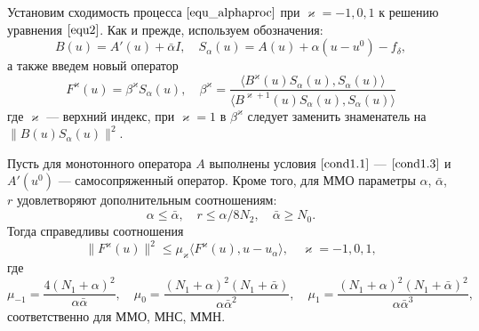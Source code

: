 Установим сходимость процесса $\eqref{equ_alphaproc}$ при $\varkappa=-1,0,1$ к решению уравнения $\eqref{equ2}$. Как и прежде, используем обозначения: 
$$B(u)=A'(u)+\bar\alpha I, \quad S_\alpha (u)=A(u)+\alpha(u-u^0)-f_\delta,
$$
а также введем новый оператор
$$F^\varkappa(u)=\beta^\varkappa S_\alpha(u), \quad \beta ^\varkappa =\frac{\langle B^\varkappa(u)S_\alpha(u), S_\alpha (u)\rangle}{\langle B^{\varkappa +1}(u)S_\alpha(u), S_\alpha(u)\rangle}$$ 
где $\varkappa$ --- верхний индекс, при $\varkappa=1$ в $\beta^\varkappa$ следует заменить знаменатель на $\|B(u)S_\alpha(u)\|^2$.%
\begin{theorem}\label{teo3.1}
	Пусть для монотонного оператора $A$ выполнены условия $\eqref{cond1.1}$ --- $\eqref{cond1.3}$ и $A'(u^0)$ --- самосопряженный оператор. Кроме того, для ММО параметры $\alpha$, $\bar\alpha$, $r$ удовлетворяют дополнительным соотношениям:
	\begin{equation}\label{cond3.3}
	\alpha \le \bar\alpha, \quad r\le \alpha/8N_2, \quad \bar\alpha \ge N_0.
	\end{equation}
	Тогда справедливы соотношения
	\begin{equation}\label{ineq3.4}
	\|F^\varkappa(u)\|^2 \le \mu_\varkappa\langle F^\varkappa(u), u-u_\alpha\rangle, \quad \varkappa=-1,0,1,
	\end{equation} где
	\begin{equation}\label{cond3.5}
	\mu _{-1}=\frac{4(N_1+\alpha)^2}{\alpha\bar\alpha}, \quad \mu _0= \frac{(N_1+\alpha)^2(N_1+\bar\alpha)}{\alpha{\bar\alpha}^2}, \quad \mu_1= \frac{(N_1+\alpha)^2(N_1+\bar\alpha)^2}{\alpha{\bar\alpha}^3},
	\end{equation}
	соответственно для ММО, МНС, ММН.
\end{theorem}

